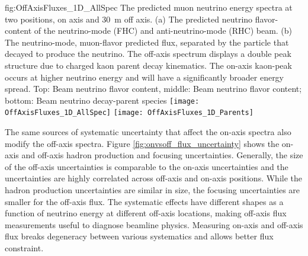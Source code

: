 \begin{dunefigure}{fig:OffAxisFluxes_1D_AllSpec}
{The predicted muon neutrino energy spectra at two  positions, on axis and \SI{30}{m} off axis. (a) The predicted neutrino flavor-content of the neutrino-mode (FHC) and anti-neutrino-mode (RHC) beam. (b) The neutrino-mode, muon-flavor predicted flux, separated by the particle that decayed to produce the neutrino. The off-axis spectrum displays a double peak structure due to charged kaon parent decay kinematics. The on-axis kaon-peak occurs at higher neutrino energy and will have a significantly broader energy spread. Top: Beam neutrino flavor content, middle: Beam neutrino flavor content; bottom: Beam neutrino decay-parent species}
    \texttt{[image: OffAxisFluxes\_1D\_AllSpec]}
  \texttt{[image: OffAxisFluxes\_1D\_Parents]}    
    \end{dunefigure}



The same sources of systematic uncertainty that affect the on-axis spectra also modify the off-axis spectra. 
Figure \ref{fig:onvsoff_flux_uncertainty} shows the on-axis and off-axis hadron production and focusing uncertainties. 
Generally, the size of the off-axis uncertainties is comparable to the on-axis uncertainties and the uncertainties are highly correlated across off-axis and on-axis positions. While the hadron production uncertainties are similar in size, the focusing uncertainties are smaller for the off-axis flux. The systematic effects have different shapes as a function of neutrino energy at different off-axis locations, making off-axis flux measurements useful to diagnose beamline physics. Measuring on-axis and off-axis flux breaks degeneracy between various systematics and allows better flux constraint.



